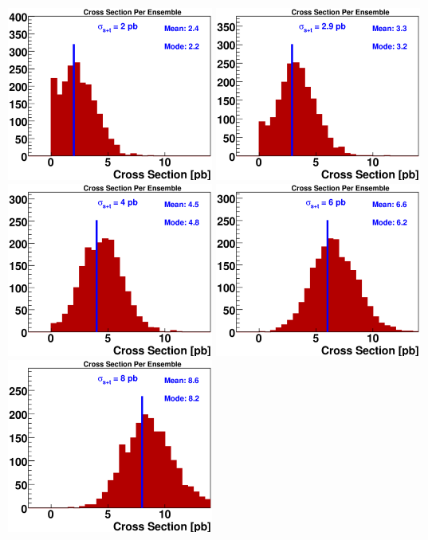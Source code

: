 \begin{figure}[!h!tbp]
\begin{center}
\includegraphics[width=0.48\textwidth]{eps/Limits/Blue2.0.eps}
\includegraphics[width=0.48\textwidth]{eps/Limits/Blue2.9.eps}
\includegraphics[width=0.48\textwidth]{eps/Limits/Blue4.0.eps}
\includegraphics[width=0.48\textwidth]{eps/Limits/Blue6.0.eps}
\includegraphics[width=0.48\textwidth]{eps/Limits/Blue8.0.eps}

\end{center}
\end{figure}
